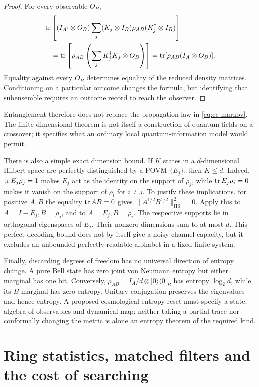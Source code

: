 \begin{proof}
For every observable $O_B$,
\begin{align*}
 &\operatorname{tr}\left[(I_{A'}\otimes O_B)
 \sum_j(K_j\otimes I_B)\rho_{AB}(K_j^\dagger\otimes I_B)\right]\\
 &\quad=\operatorname{tr}\left[\rho_{AB}
 \left(\sum_jK_j^\dagger K_j\otimes O_B\right)\right]
 =\operatorname{tr}[\rho_{AB}(I_A\otimes O_B)].
\end{align*}
Equality against every $O_B$ determines equality of the reduced density
matrices. Conditioning on a particular outcome changes the formula,
but identifying that subensemble requires an outcome record to reach
the observer.
\end{proof}

Entanglement therefore does not replace the propagation law in
\eqref{eq:cc-markov}. The finite-dimensional theorem is not itself a
construction of quantum fields on a crossover; it specifies what an
ordinary local quantum-information model would permit.

There is also a simple exact dimension bound. If $K$ states in a
$d$-dimensional Hilbert space are perfectly distinguished by a POVM
$\{E_j\}$, then $K\le d$. Indeed, $\operatorname{tr} E_j\rho_j=1$ makes $E_j$ act as
the identity on the support of $\rho_j$, while
$\operatorname{tr} E_j\rho_i=0$ makes it vanish on the support of $\rho_i$ for
$i\ne j$. To justify these implications, for positive $A,B$ the equality
$\operatorname{tr} AB=0$ gives $\|A^{1/2}B^{1/2}\|_{\mathrm{HS}}^2=0$.
Apply this to $A=I-E_j,B=\rho_j$, and to $A=E_j,B=\rho_i$.
The respective supports lie in orthogonal eigenspaces of $E_j$.
Their nonzero dimensions sum to at most $d$. This perfect-decoding bound
does not by itself give a noisy channel capacity, but it excludes an
unbounded perfectly readable alphabet in a fixed finite system.

Finally, discarding degrees of freedom has no universal direction of
entropy change. A pure Bell state has zero joint von Neumann entropy
but either marginal has one bit. Conversely,
$\rho_{AB}=I_A/d\otimes|0\rangle\langle0|_B$ has entropy $\log_2d$,
while its $B$ marginal has zero entropy. Unitary conjugation preserves
the eigenvalues and hence entropy. A proposed cosmological entropy
reset must specify a state, algebra of observables and dynamical map;
neither taking a partial trace nor conformally changing the metric is
alone an entropy theorem of the required kind.

\section{Ring statistics, matched filters and the cost of searching}
\label{sec:cc-statistics}


